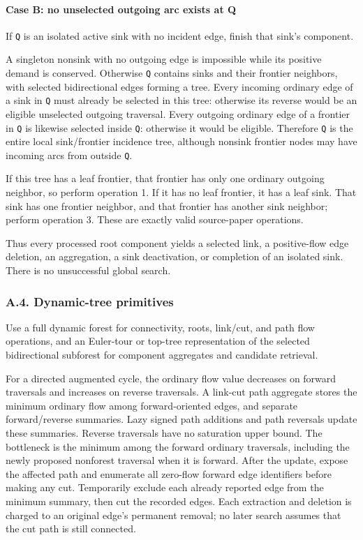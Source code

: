 \hypertarget{af-385fd70686-case-b-no-unselected-outgoing-arc-exists-at-q}{%
\paragraph{Case B: no unselected outgoing arc exists at Q}\label{af-385fd70686-case-b-no-unselected-outgoing-arc-exists-at-q}}

If \texttt{Q} is an isolated active sink with no incident edge, finish that sink's component.

A singleton nonsink with no outgoing edge is impossible while its positive demand is conserved. Otherwise \texttt{Q} contains sinks and their frontier neighbors, with selected bidirectional edges forming a tree. Every incoming ordinary edge of a sink in \texttt{Q} must already be selected in this tree: otherwise its reverse would be an eligible unselected outgoing traversal. Every outgoing ordinary edge of a frontier in \texttt{Q} is likewise selected inside \texttt{Q}: otherwise it would be eligible. Therefore \texttt{Q} is the entire local sink/frontier incidence tree, although nonsink frontier nodes may have incoming arcs from outside \texttt{Q}.

If this tree has a leaf frontier, that frontier has only one ordinary outgoing neighbor, so perform operation 1. If it has no leaf frontier, it has a leaf sink. That sink has one frontier neighbor, and that frontier has another sink neighbor; perform operation 3. These are exactly valid source-paper operations.

Thus every processed root component yields a selected link, a positive-flow edge deletion, an aggregation, a sink deactivation, or completion of an isolated sink. There is no unsuccessful global search.

\hypertarget{af-385fd70686-a.4.-dynamic-tree-primitives}{%
\subsubsection{A.4. Dynamic-tree primitives}\label{af-385fd70686-a.4.-dynamic-tree-primitives}}

Use a full dynamic forest for connectivity, roots, link/cut, and path flow operations, and an Euler-tour or top-tree representation of the selected bidirectional subforest for component aggregates and candidate retrieval.

For a directed augmented cycle, the ordinary flow value decreases on forward traversals and increases on reverse traversals. A link-cut path aggregate stores the minimum ordinary flow among forward-oriented edges, and separate forward/reverse summaries. Lazy signed path additions and path reversals update these summaries. Reverse traversals have no saturation upper bound. The bottleneck is the minimum among the forward ordinary traversals, including the newly proposed nonforest traversal when it is forward. After the update, expose the affected path and enumerate all zero-flow forward edge identifiers before making any cut. Temporarily exclude each already reported edge from the minimum summary, then cut the recorded edges. Each extraction and deletion is charged to an original edge's permanent removal; no later search assumes that the cut path is still connected.

